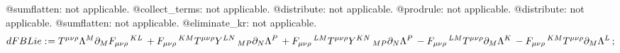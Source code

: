 \documentclass[11pt]{article}
\def\specialcolon{\mathrel{\mathop{:}}\hspace{-.5em}}
\begin{document}
@sumflatten: not applicable.
@collect\_terms: not applicable.
@distribute: not applicable.
@prodrule: not applicable.
@distribute: not applicable.
@sumflatten: not applicable.
@eliminate\_kr: not applicable.
\begin{dmath*}[compact, spread=2pt]
dFBLie\specialcolon{}= {T}^{\mu \nu \rho} {\Lambda}^{M} {\partial}_{M}{{F}_{\mu \nu \rho}\,^{K L}}\,  + {F}_{\mu \nu \rho}\,^{K M} {T}^{\mu \nu \rho} {Y}^{L N}\,_{M P} {\partial}_{N}{{\Lambda}^{P}}\,  + {F}_{\mu \nu \rho}\,^{L M} {T}^{\mu \nu \rho} {Y}^{K N}\,_{M P} {\partial}_{N}{{\Lambda}^{P}}\,  - {F}_{\mu \nu \rho}\,^{L M} {T}^{\mu \nu \rho} {\partial}_{M}{{\Lambda}^{K}}\,  - {F}_{\mu \nu \rho}\,^{K M} {T}^{\mu \nu \rho} {\partial}_{M}{{\Lambda}^{L}}\, ;
\end{dmath*}
\end{document}
